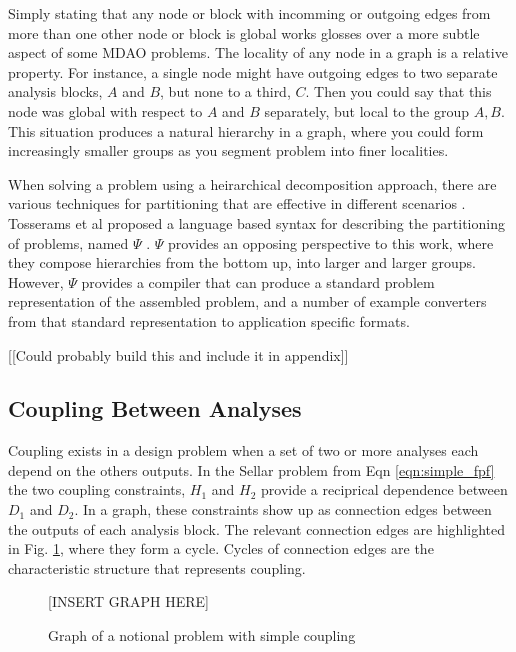   Simply stating that any node or block with incomming or outgoing edges
  from more than one other node or block is global works glosses over a more 
  subtle aspect of some MDAO problems. The locality of any node in a graph is 
  a relative property. For instance, a single node might have outgoing edges 
  to two separate analysis blocks, $A$ and $B$, but none to a third, $C$. Then 
  you could say that this node was global with respect to $A$ and $B$ separately, but local 
  to the group $A,B$. This situation produces a natural 
  hierarchy in a graph, where you could form increasingly smaller groups as you 
  segment problem into finer localities. 

  When solving a problem using a heirarchical decomposition approach, 
  there are various techniques for partitioning that are effective in different 
  scenarios \cite{krishnamachari1997optimal,michelena1997hypergraph,sobieszczanski1997,Perez2004,allison2009optimal}. 
  Tosserams et al proposed a language based syntax for describing the partitioning of problems, named $\Psi$
  \cite{tosserams2010specification}. $\Psi$ provides an opposing perspective to 
  this work, where they compose hierarchies from the bottom up, into larger and 
  larger groups. However, $\Psi$ provides a compiler that can produce a standard 
  problem representation of the assembled problem, and a number of example converters
  from that standard representation to application specific formats. 

  [[Could probably build this and include it in appendix]] 


\subsection{Coupling Between Analyses}

  Coupling exists in a design problem when a set of two or more analyses each depend on the
  others outputs. In the Sellar problem from Eqn \ref{eqn:simple_fpf} the two 
  coupling constraints, $H_1$ and $H_2$ provide a reciprical dependence between 
  $D_1$ and $D_2$. In a graph, these constraints show up as connection edges between 
  the outputs of each analysis block. The relevant connection edges are highlighted in 
  Fig. \ref{f:coupling}, where they form a cycle. Cycles of connection edges are the characteristic 
  structure that represents coupling. 

  \begin{figure}
      \begin{center}
      [INSERT GRAPH HERE]
      \caption{Graph of a notional problem with simple coupling \label{f:coupling}}
      \end{center}
  \end{figure}

